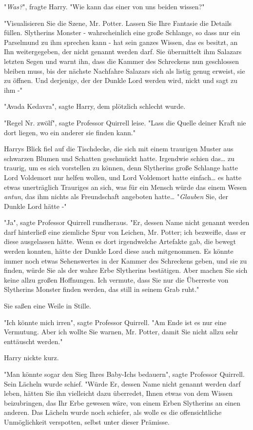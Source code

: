 {"\emph{Was?}", fragte Harry. "Wie kann das einer von uns beiden wissen?"

"Visualisieren Sie die Szene, Mr. Potter. Lassen Sie Ihre Fantasie die Details füllen. Slytherins Monster - wahrscheinlich eine große Schlange, so dass nur ein Parselmund zu ihm sprechen kann - hat sein ganzes Wissen, das es besitzt, an Ihn weitergegeben, der nicht genannt werden darf. Sie übermittelt ihm Salazars letzten Segen und warnt ihn, dass die Kammer des Schreckens nun geschlossen bleiben muss, bis der nächste Nachfahre Salazars sich als listig genug erweist, sie zu öffnen. Und derjenige, der der Dunkle Lord werden wird, nickt und sagt zu ihm -"

"Avada Kedavra", sagte Harry, dem plötzlich schlecht wurde.

"Regel Nr. zwölf", sagte Professor Quirrell leise. "Lass die Quelle deiner Kraft nie dort liegen, wo ein anderer sie finden kann."

Harrys Blick fiel auf die Tischdecke, die sich mit einem traurigen Muster aus schwarzen Blumen und Schatten geschmückt hatte. Irgendwie schien das… zu traurig, um es sich vorstellen zu können, denn Slytherins große Schlange hatte Lord Voldemort nur helfen wollen, und Lord Voldemort hatte einfach… es hatte etwas unerträglich Trauriges an sich, was für ein Mensch würde das einem Wesen \emph{antun}, das ihm nichts als Freundschaft angeboten hatte… "\emph{Glauben} Sie, der Dunkle Lord hätte -"

"Ja", sagte Professor Quirrell rundheraus. "Er, dessen Name nicht genannt werden darf hinterließ eine ziemliche Spur von Leichen, Mr. Potter; ich bezweifle, dass er diese ausgelassen hätte. Wenn es dort irgendwelche Artefakte gab, die bewegt werden konnten, hätte der Dunkle Lord diese auch mitgenommen. Es könnte immer noch etwas Sehenswertes in der Kammer des Schreckens geben, und sie zu finden, würde Sie als der wahre Erbe Slytherins bestätigen. Aber machen Sie sich keine allzu großen Hoffnungen. Ich vermute, dass Sie nur die Überreste von Slytherins Monster finden werden, das still in seinem Grab ruht."

Sie saßen eine Weile in Stille.

"Ich könnte mich irren", sagte Professor Quirrell. "Am Ende ist es nur eine Vermutung. Aber ich wollte Sie warnen, Mr. Potter, damit Sie nicht allzu sehr enttäuscht werden."

Harry nickte kurz.

"Man könnte sogar den Sieg Ihres Baby-Ichs bedauern", sagte Professor Quirrell. Sein Lächeln wurde schief. "Würde Er, dessen Name nicht genannt werden darf leben, hätten Sie ihn vielleicht dazu überredet, Ihnen etwas von dem Wissen beizubringen, das Ihr Erbe gewesen wäre, von einem Erben Slytherins an einen anderen. Das Lächeln wurde noch schiefer, als wolle es die offensichtliche Unmöglichkeit verspotten, selbst unter dieser Prämisse.

}

